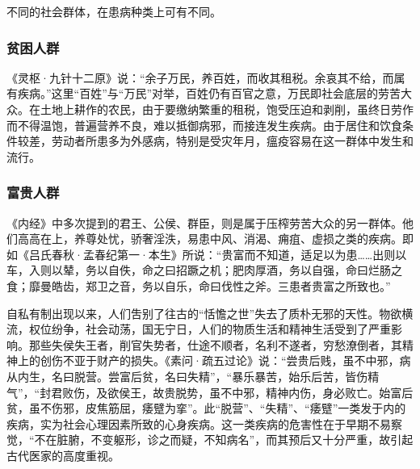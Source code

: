 \documentclass[12pt]{ctexbook}
\begin{document}
不同的社会群体，在患病种类上可有不同。

\subsubsection{贫困人群}%

《灵枢·九针十二原》说：“余子万民，养百姓，而收其租税。余哀其不给，而属有疾病。”这里“百姓”与“万民”对举，百姓仍有百官之意，万民即社会底层的劳苦大众。在土地上耕作的农民，由于要缴纳繁重的租税，饱受压迫和剥削，虽终日劳作而不得温饱，普遍营养不良，难以抵御病邪，而接连发生疾病。由于居住和饮食条件较差，劳动者所患多为外感病，特别是受灾年月，瘟疫容易在这一群体中发生和流行。

\subsubsection{富贵人群}%

《内经》中多次提到的君王、公侯、群臣，则是属于压榨劳苦大众的另一群体。他们高高在上，养尊处忧，骄奢淫泆，易患中风、消渴、痈疽、虚损之类的疾病。即如《吕氏春秋·孟春纪第一·本生》所说：“贵富而不知道，适足以为患……出则以车，入则以辇，务以自佚，命之曰招蹶之机；肥肉厚酒，务以自强，命曰烂肠之食；靡曼皓齿，郑卫之音，务以自乐，命曰伐性之斧。三患者贵富之所致也。”

自私有制出现以来，人们吿别了往古的“恬憺之世”失去了质朴无邪的天性。物欲横流，权位纷争，社会动荡，国无宁日，人们的物质生活和精神生活受到了严重影响。那些失侯失王者，削官失势者，仕途不顺者，名利不遂者，穷愁潦倒者，其精神上的创伤不亚于财产的损失。《素问·疏五过论》说：“尝贵后贱，虽不中邪，病从内生，名曰脱营。尝富后贫，名曰失精”，“暴乐暴苦，始乐后苦，皆伤精气”，“封君败伤，及欲侯王，故贵脱势，虽不中邪，精神内伤，身必败亡。始富后贫，虽不伤邪，皮焦筋屈，痿躄为挛”。此“脱营”、“失精”、“痿躄”一类发于内的疾病，实为社会心理因素所致的心身疾病。这一类疾病的危害性在于早期不易察觉，“不在脏腑，不变躯形，诊之而疑，不知病名”，而其预后又十分严重，故引起古代医家的高度重视。
\end{document}
